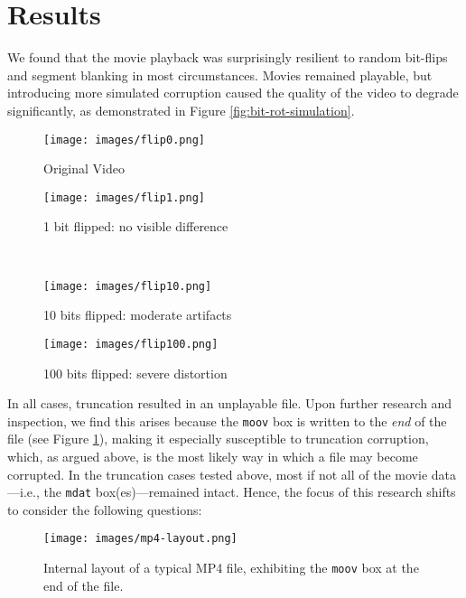 \section{Results}

We found that the movie playback was surprisingly resilient to random bit-flips and segment blanking in most circumstances. Movies remained playable, but introducing more simulated corruption caused the quality of the video to degrade significantly, as demonstrated in Figure \ref{fig:bit-rot-simulation}.

\begin{figure*}[ht]
	\centering
	\begin{subfigure}[b]{0.4\textwidth}
		\centering
		\texttt{[image: images/flip0.png]}
		\caption{Original Video}
	\end{subfigure}
	\hspace{0.25in}
	\begin{subfigure}[b]{0.4\textwidth}
		\centering
		\texttt{[image: images/flip1.png]}
		\caption{1 bit flipped: no visible difference}
	\end{subfigure}
	\\
	\begin{subfigure}[b]{0.4\textwidth}
		\centering
		\texttt{[image: images/flip10.png]}
		\caption{10 bits flipped: moderate artifacts}
	\end{subfigure}
	\hspace{0.25in}
	\begin{subfigure}[b]{0.4\textwidth}
		\centering
		\texttt{[image: images/flip100.png]}
		\caption{100 bits flipped: severe distortion}
	\end{subfigure}
	\caption{Effects of simulated bit rot on video quality}
	\label{fig:bit-rot-simulation}
\end{figure*}

In all cases, truncation resulted in an unplayable file. Upon further research and inspection, we find this arises because the \texttt{moov} box is written to the \emph{end} of the file (see Figure \ref{fig:mp4-layout}), making it especially susceptible to truncation corruption, which, as argued above, is the most likely way in which a file may become corrupted. In the truncation cases tested above, most if not all of the movie data---i.e., the \texttt{mdat} box(es)---remained intact. Hence, the focus of this research shifts to consider the following questions:

\begin{figure}[h]
	\centering
	\texttt{[image: images/mp4-layout.png]}
	\caption{Internal layout of a typical MP4 file, exhibiting the \texttt{moov} box at the end of the file.}
	\label{fig:mp4-layout}
\end{figure}


